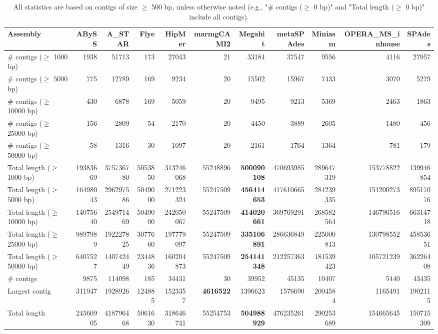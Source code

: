 \documentclass[12pt,a4paper]{article}
\begin{document}
\begin{table}[ht]
\begin{center}
\caption{All statistics are based on contigs of size $\geq$ 500 bp, unless otherwise noted (e.g., "\# contigs ($\geq$ 0 bp)" and "Total length ($\geq$ 0 bp)" include all contigs).}
\begin{tabular}{|l*{10}{|r}|}
\hline
Assembly & ABySS & A\_STAR & Flye & HipMer & marmgCAMI2 & Megahit & metaSPAdes & Miniasm & OPERA\_MS\_inhouse & SPAdes \\ \hline
\# contigs ($\geq$ 1000 bp) & 1938 & 51713 & 173 & 27043 & 21 & 33184 & 37547 & 9556 & 4116 & 27957 \\ \hline
\# contigs ($\geq$ 5000 bp) & 775 & 12789 & 169 & 9234 & 20 & 15502 & 15967 & 7433 & 3070 & 5279 \\ \hline
\# contigs ($\geq$ 10000 bp) & 430 & 6878 & 169 & 5059 & 20 & 9495 & 9213 & 5369 & 2463 & 1863 \\ \hline
\# contigs ($\geq$ 25000 bp) & 156 & 2809 & 54 & 2170 & 20 & 4450 & 3889 & 2605 & 1480 & 456 \\ \hline
\# contigs ($\geq$ 50000 bp) & 58 & 1316 & 30 & 1097 & 20 & 2161 & 1764 & 1364 & 781 & 179 \\ \hline
Total length ($\geq$ 1000 bp) & 19383669 & 375736780 & 5053850 & 313246068 & 55248896 & {\bf 500090108} & 470693985 & 289647319 & 153778822 & 139946854 \\ \hline
Total length ($\geq$ 5000 bp) & 16498043 & 296297586 & 5049000 & 271223324 & 55247509 & {\bf 456414653} & 417610665 & 284239335 & 151200273 & 89517076 \\ \hline
Total length ($\geq$ 10000 bp) & 14075640 & 254971469 & 5049000 & 242050067 & 55247509 & {\bf 414020661} & 369769291 & 268582564 & 146796516 & 66314718 \\ \hline
Total length ($\geq$ 25000 bp) & 9897989 & 192227825 & 3077660 & 197779097 & 55247509 & {\bf 335106891} & 286636849 & 225000813 & 130798552 & 45853651 \\ \hline
Total length ($\geq$ 50000 bp) & 6407527 & 140742449 & 2344836 & 160204873 & 55247509 & {\bf 254141348} & 212257363 & 181539423 & 105721239 & 36226408 \\ \hline
\# contigs & 9875 & 114098 & 185 & 34431 & 30 & 39952 & 45135 & 10407 & 5440 & 43435 \\ \hline
Largest contig & 311947 & 1928926 & 124885 & 1523357 & {\bf 4616522} & 1396623 & 1576690 & 2004584 & 1165491 & 1902115 \\ \hline
Total length & 24560905 & 418796468 & 5061630 & 318646741 & 55254753 & {\bf 504988929} & 476235261 & 290253689 & 154665645 & 150715309 \\ \hline

\end{tabular}
\end{center}
\end{table}
\end{document}
